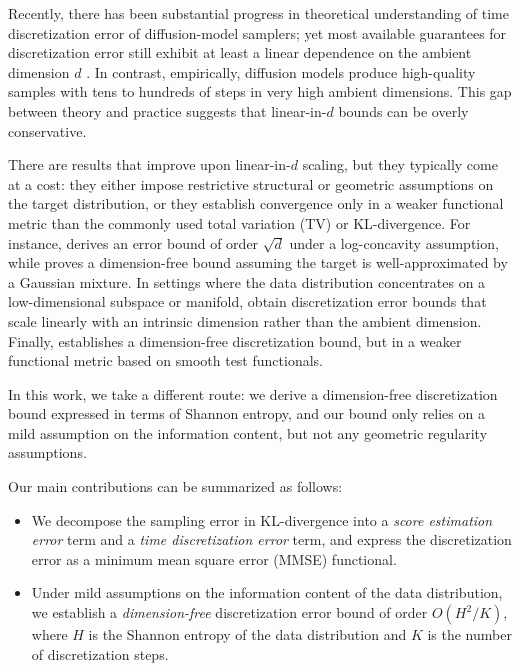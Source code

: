 \documentclass[11pt]{article}
\theoremstyle{definition}
\numberwithin{equation}{section}
\begin{document}
Recently, there has been substantial progress in theoretical understanding of time discretization error of diffusion-model samplers; yet most available guarantees for discretization error still exhibit at least a linear dependence on the ambient dimension $d$ \cite{benton2024nearly,li2025odt}. In contrast, empirically, diffusion models produce high-quality samples with tens to hundreds of steps in very high ambient dimensions. This gap between theory and practice suggests that linear-in-$d$ bounds can be overly conservative. 

There are results that improve upon linear-in-$d$ scaling, but they typically come at a cost: they either impose restrictive structural or geometric assumptions on the target distribution, or they establish convergence only in a weaker functional metric than the commonly used total variation (TV) or KL-divergence. For instance, \cite{bruno2025on} derives an error bound of order $\sqrt{d}$ under a log-concavity assumption, while \cite{li2025dimension} proves a dimension-free bound assuming the target is well-approximated by a Gaussian mixture. In settings where the data distribution concentrates on a low-dimensional subspace or manifold, \cite{li2025odt,liang2025low,pmlr-v291-potaptchik25a} obtain discretization error bounds that scale linearly with an intrinsic dimension rather than the ambient dimension. Finally, \cite{de2025dimension} establishes a dimension-free discretization bound, but in a weaker functional metric based on smooth test functionals.

In this work, we take a different route: we derive a dimension-free discretization bound expressed in terms of Shannon entropy, and our bound only relies on a mild assumption on the information content, but not any geometric regularity assumptions.


Our main contributions can be summarized as follows:
\begin{itemize}
    \item We decompose the sampling error in KL-divergence into a \emph{score estimation error} term and a \emph{time discretization error} term, and express the discretization error as a minimum mean square error (MMSE) functional.
    \item Under mild assumptions on the information content of the data distribution, we establish a \emph{dimension-free} discretization error bound of order $O(H^2 / K)$, where $H$ is the Shannon entropy of the data distribution and $K$ is the number of discretization steps.
\end{itemize}
\end{document}
